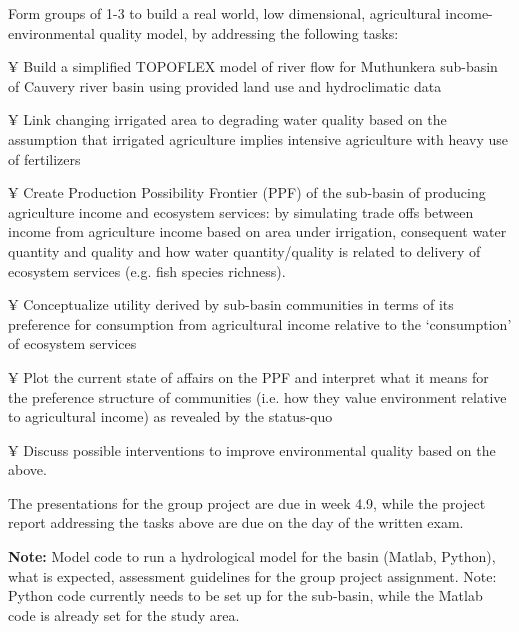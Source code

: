 

Form groups of 1-3 to build a real world, low dimensional, agricultural income-environmental quality model, by addressing the following tasks:

¥	Build a simplified TOPOFLEX model of river flow for Muthunkera sub-basin of Cauvery river basin using provided land use and hydroclimatic data

¥	Link changing irrigated area to degrading water quality based on the assumption that irrigated agriculture implies intensive agriculture with heavy use of fertilizers

¥	Create Production Possibility Frontier (PPF) of the sub-basin of producing agriculture income and ecosystem services: by simulating trade offs between income from agriculture income based on area under irrigation, consequent water quantity and quality and  how water quantity/quality is related to delivery of ecosystem services (e.g. fish species richness).

¥	Conceptualize  utility derived by sub-basin communities in terms of its preference for consumption from agricultural income relative to the ‘consumption’ of ecosystem services

¥	Plot the current state of affairs on the PPF and interpret what it means for the preference structure of communities (i.e. how they value environment relative to agricultural income) as revealed by the status-quo 

¥	Discuss possible interventions to improve environmental quality based on the above. 

The presentations for the group project are due in week 4.9, while the project report addressing the tasks above are due on the day of the written exam. 



\textbf{Note:} Model code to run a hydrological model for the basin (Matlab, Python), what is expected, assessment guidelines for the group project assignment.  Note: Python code currently needs to be set up for the sub-basin, while the Matlab code is already set for the study area. 